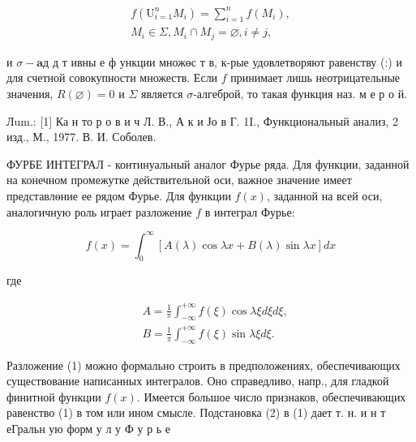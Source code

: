 \documentclass[10pt]{article}
\begin{document}
\[

\begin{gathered}

f\left(\mathrm{U}_{i=1}^{n} M_{i}\right)=\sum_{i=1}^{n} f\left(M_{i}\right), \\

M_{i} \in \Sigma, M_{i} \cap M_{j}=\varnothing, i \neq j,

\end{gathered}

\]



и $\sigma-\mathbf{a} д$ д т ивны е ф ункции множөс т в, к-рые удовлетворяют равенству (:) и для счетной совокупности множеств. Если $f$ принимает лишь неотрицательные значения, $R(\varnothing)=0$ и $\Sigma$ является $\sigma$-алгеброй, то такая функция наз. м е р о й.



Лum.: [1] Ка н то р о в и ч Л. В., А к и Јо в Г. 1I., Функциональный анализ, 2 изд., М., 1977. В. И. Соболев.

ФУРБЕ ИНТЕГРАЛ - континуальный аналог Фурье ряда. Для функции, заданной на конечном промежутке действительной оси, важное значение имеет представлөние ее рядом Фурье. Для функции $f(x)$, заданной на всей оси, аналогичную роль играет разложение $f$ в интеграл Фурье:



\[

f(x)=\int_{0}^{\infty}[A(\lambda) \cos \lambda x+B(\lambda) \sin \lambda x] d x

\]



где



\[

\begin{aligned}

& A=\frac{1}{\pi} \int_{-\infty}^{+\infty} f(\xi) \cos \lambda \xi d \xi d \xi, \\

& B=\frac{1}{\pi} \int_{-\infty}^{+\infty} f(\xi) \sin \lambda \xi d \xi .

\end{aligned}

\]



Разложение (1) можно формально строить в предположениях, обеспечивающих существование написанных интегралов. Оно справедливо, напр., для гладкой финитной функции $f(x)$. Имеется большое число признаков, обеспечивающих равенство (1) в том или ином смысле. Подстановка (2) в (1) дает т. н. и н т еГральн ую форм у л у Ф у р ь е
\end{document}

